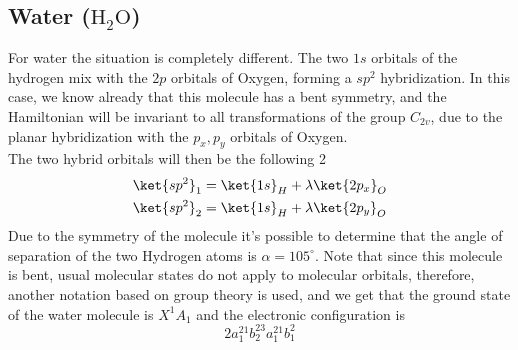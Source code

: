 \documentclass[a4paper, 11pt]{book}
\newcommand{\1}{\opr{\mathds{1}}}
\theoremstyle{plain}
\begin{document}
	\subsection{Water ($\mathrm{H_2O}$)}
	For water the situation is completely different. The two $1s$ orbitals of the hydrogen mix with the $2p$ orbitals of Oxygen, forming a $sp^2$ hybridization. In this case, we know already that this molecule has a bent symmetry, and the Hamiltonian will be invariant to all transformations of the group $C_{2v}$, due to the planar hybridization with the $p_x,p_y$ orbitals of Oxygen.\\
	The two hybrid orbitals will then be the following 2
	\begin{equation}
		\begin{aligned}
			\ket{sp^2}_1&=\ket{1s}_H+\lambda\ket{2p_x}_O\\
			\ket{sp^2}_2&=\ket{1s}_H+\lambda\ket{2p_y}_O
		\end{aligned}
		\label{eq:sp2h2ohyb}
	\end{equation}
	Due to the symmetry of the molecule it's possible to determine that the angle of separation of the two Hydrogen atoms is $\alpha=105^{\circ}$. Note that since this molecule is bent, usual molecular states do not apply to molecular orbitals, therefore, another notation based on group theory is used, and we get that the ground state of the water molecule is $X^1A_1$ and the electronic configuration is
	\begin{equation*}
		2a_1^21b_2^23a_1^21b_1^2
	\end{equation*}
\end{document}
